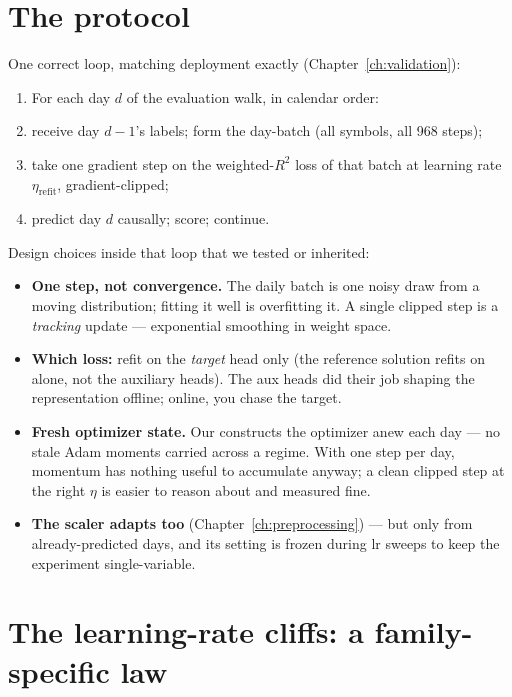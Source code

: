 \section{The protocol}

One correct loop, matching deployment exactly
(Chapter~\ref{ch:validation}):

\begin{enumerate}
\item For each day $d$ of the evaluation walk, in calendar order:
\item \quad receive day $d{-}1$'s labels; form the day-batch
  (all symbols, all 968 steps);
\item \quad take one gradient step on the weighted-$R^2$ loss of that
  batch at learning rate $\eta_{\text{refit}}$, gradient-clipped;
\item \quad predict day $d$ causally; score; continue.
\end{enumerate}

Design choices inside that loop that we tested or inherited:

\begin{itemize}
\item \textbf{One step, not convergence.} The daily batch is one noisy
  draw from a moving distribution; fitting it well is overfitting it.
  A single clipped step is a \emph{tracking} update --- exponential
  smoothing in weight space.
\item \textbf{Which loss:} refit on the \emph{target} head only
  (the reference solution refits on  alone, not the auxiliary
  heads). The aux heads did their job shaping the representation offline;
  online, you chase the target.
\item \textbf{Fresh optimizer state.} Our  constructs the
  optimizer anew each day --- no stale Adam moments carried across a
  regime. With one step per day, momentum has nothing useful to
  accumulate anyway; a clean clipped step at the right $\eta$ is easier to
  reason about and measured fine.
\item \textbf{The scaler adapts too} (Chapter~\ref{ch:preprocessing}) ---
  but only from already-predicted days, and its setting is frozen during
  lr sweeps to keep the experiment single-variable.
\end{itemize}

\section{The learning-rate cliffs: a family-specific law}

